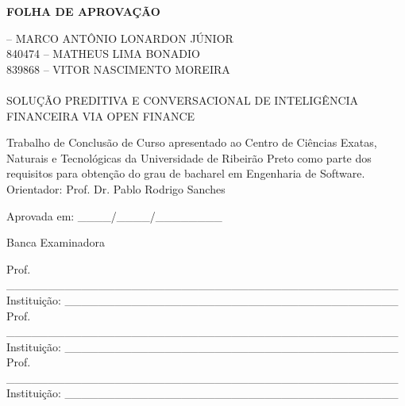 \newpage
\thispagestyle{empty}
\begin{center}
    \fontsize{14pt}{14pt}\selectfont\bfseries FOLHA DE APROVAÇÃO\\[24pt]
\end{center}

 -- MARCO ANTÔNIO LONARDON JÚNIOR\\
840474 -- MATHEUS LIMA BONADIO\\
839868 -- VITOR NASCIMENTO MOREIRA\\ \\
SOLUÇÃO PREDITIVA E CONVERSACIONAL DE INTELIGÊNCIA FINANCEIRA VIA OPEN FINANCE\\[12pt]

\begin{flushright}
    \parbox{8cm}{
        \fontsize{12pt}{12pt}\selectfont
        Trabalho de Conclusão de Curso apresentado ao Centro de Ciências Exatas, Naturais e Tecnológicas da Universidade de Ribeirão Preto como parte dos requisitos para obtenção do grau de bacharel em Engenharia de Software.\\[12pt]
        Orientador: Prof. Dr. Pablo Rodrigo Sanches
    }
\end{flushright}

\noindent Aprovada em: \_\_\_\_/\_\_\_\_/\_\_\_\_\_\_\_\_\\[24pt]

\begin{center}
    Banca Examinadora
\end{center}\vspace{24pt}

\noindent Prof. \_\_\_\_\_\_\_\_\_\_\_\_\_\_\_\_\_\_\_\_\_\_\_\_\_\_\_\_\_\_\_\_\_\_\_\_\_\_\_\_\_\_\_\_\_\_\_\\
Instituição: \_\_\_\_\_\_\_\_\_\_\_\_\_\_\_\_\_\_\_\_\_\_\_\_\_\_\_\_\_\_\_\_\_\_\_\_\_\_\_\_\\[18pt]

\noindent Prof. \_\_\_\_\_\_\_\_\_\_\_\_\_\_\_\_\_\_\_\_\_\_\_\_\_\_\_\_\_\_\_\_\_\_\_\_\_\_\_\_\_\_\_\_\_\_\_\\
Instituição: \_\_\_\_\_\_\_\_\_\_\_\_\_\_\_\_\_\_\_\_\_\_\_\_\_\_\_\_\_\_\_\_\_\_\_\_\_\_\_\_\\[18pt]

\noindent Prof. \_\_\_\_\_\_\_\_\_\_\_\_\_\_\_\_\_\_\_\_\_\_\_\_\_\_\_\_\_\_\_\_\_\_\_\_\_\_\_\_\_\_\_\_\_\_\_\\
Instituição: \_\_\_\_\_\_\_\_\_\_\_\_\_\_\_\_\_\_\_\_\_\_\_\_\_\_\_\_\_\_\_\_\_\_\_\_\_\_\_\_\\
